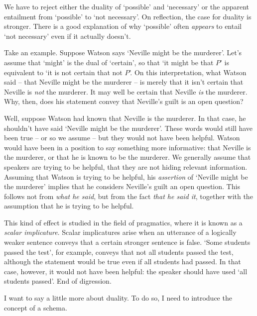 
We have to reject either the duality of `possible' and `necessary' or the
apparent entailment from `possible' to `not necessary'. On reflection, the case
for duality is stronger. There is a good explanation of why `possible' often
\emph{appears} to entail `not necessary' even if it actually doesn't.


Take an example. Suppose Watson says `Neville might be the murderer'. Let's
assume that `might' is the dual of `certain', so that `it might be that $P$' is
equivalent to `it is not certain that not $P$'. On this interpretation, what
Watson said -- that Neville might be the murderer -- is merely that it isn't
certain that Neville is \emph{not} the murderer. It may well be certain that
Neville \emph{is} the murderer. Why, then, does his statement convey that
Neville's guilt is an open question?


Well, suppose Watson had known that Neville is the murderer. In that case, he
shouldn't have said `Neville might be the murderer'. These words would still
have been true -- or so we assume -- but they would not have been helpful.
Watson would have been in a position to say something more informative: that
Neville is the murderer, or that he is known to be the murderer. We generally
assume that speakers are trying to be helpful, that they are not hiding relevant
information. Assuming that Watson is trying to be helpful, his \emph{assertion}
of `Neville might be the murderer' implies that he considers Neville's guilt an
open question. This follows not from \emph{what he said}, but from the fact
\emph{that he said it}, together with the assumption that he is trying to be
helpful.


This kind of effect is studied in the field of pragmatics, where it is known as
a \emph{scalar implicature}. Scalar implicatures arise when an utterance of a
logically weaker sentence conveys that a certain stronger sentence is false.
`Some students passed the test', for example, conveys that not all students
passed the test, although the statement would be true even if all students had
passed. In that case, however, it would not have been helpful: the speaker
should have used `all students passed'.
End of digression.


I want to say a little more about duality. To do so, I need to introduce the
concept of a schema.


